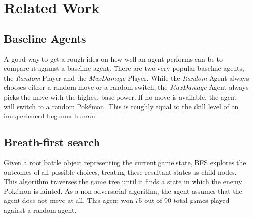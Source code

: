
\chapter{Related Work}
\label{ch:relatedwork}

\section{Baseline Agents}
\label{sec:eval-challenges-baseline}
A good way to get a rough idea on how well an agent performs can be to compare it against a baseline agent.
There are two very popular baseline agents, the \textit{Random}-Player and the \textit{MaxDamage}-Player.
While the \textit{Random}-Agent always chooses either a random move or a random switch, the \textit{MaxDamage}-Agent
always picks the move with the highest base power. If no move is available, the agent will switch to a random 
Pokémon. This is roughly equal to the skill level of an inexperienced beginner human. 

\section{Breath-first search}
\label{sec:related-bfs}
Given a root battle object representing the current game state, \ac{BFS} explores the outcomes of all possible choices,
treating these resultant states as child nodes. This algorithm traverses the game tree until it finds a state in which
the enemy Pokémon is fainted. As a non-adversarial algorithm, the agent assumes that the agent does not move at all.
This agent won 75 out of 90 total games played against a random agent\cite{Lee_Togelius_2017}.

